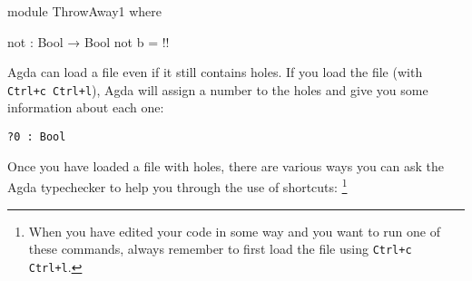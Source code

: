 \documentclass[a4paper,UKenglish]{tufte-handout}
\theoremstyle{definition}
\begin{document}
\begin{code}[hide]
module ThrowAway1 where
\end{code}
\begin{code}[number]
  not : Bool → Bool
  not b = {!!}
\end{code}
Agda can load a file even if it still contains holes. If you load the
file (with \texttt{Ctrl+c Ctrl+l}), Agda will assign a number to the holes and give you
some information about each one:
\begin{verbatim}
?0 : Bool
\end{verbatim}
Once you have loaded a file with holes, there are various ways you can
ask the Agda typechecker to help you through the use of shortcuts:%
\footnote{When you have edited your code in some way and you
want to run one of these commands, always remember to first load the
file using \texttt{Ctrl+c Ctrl+l}.}
\end{document}
